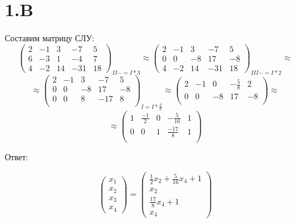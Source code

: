 \documentclass[a4paper]{article}
\begin{document}
\section*{1.B}
Составим матрицу СЛУ:
\begin{equation*}
    \left(\begin{array}{rrrr|r}
   2 & -1 & 3 & -7 &5\\
   6 & -3 & 1 & -4 & 7\\
  4 & -2 & 14 & -31 & 18 
   \end{array}\right)_{II -= I * 3}
   \approx
   \left(\begin{array}{rrrr|r}
   2 & -1 & 3 & -7 &5\\
   0 & 0 & -8 & 17 & -8\\
  4 & -2 & 14 & -31 & 18 
   \end{array}\right)_{III -= I * 2}
\approx
\end{equation*}
\begin{equation*}
\approx
   \left(\begin{array}{rrrr|r}
   2 & -1 & 3 & -7 &5\\
   0 & 0 & -8 & 17 & -8\\
   0 & 0 & 8 & -17 & 8\\
   \end{array}\right)_{I = I * \frac{3}{8}}
\approx
   \left(\begin{array}{rrrr|r}
    2 & -1 & 0 & -\frac{5}{8} &2\\
   0 & 0 & -8 & 17 & -8\\
   \end{array}\right)
  \approx
\end{equation*}
\begin{equation*}
\approx
   \left(\begin{array}{rrrr|r}
   1 & \frac{-1}{2} & 0 & -\frac{5}{16} &1\\
   0 & 0 & 1 & \frac{-17}{8} & 1\\
   \end{array}\right)
\end{equation*}

Ответ:

\begin{equation*}
\begin{pmatrix}
  x_1 \\
  x_2\\
  x_3\\
  x_4
\end{pmatrix} = 
\begin{pmatrix}
  \frac{1}{2} x_2 + \frac{5}{16}x_4 + 1\\
  x_2\\
  \frac{17}{8}x_4 + 1\\
	x_4
\end{pmatrix}
\end{equation*}
\end{document}
